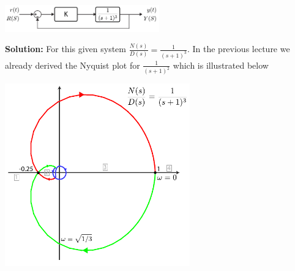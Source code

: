 \documentclass[twoside]{article}
\begin{document}
\vspace{6 pt}

  \begin{minipage}[h]{1\linewidth}
    \begin{center}
      \includegraphics[width=0.5\textwidth]{ex3block}
    \end{center}
  \end{minipage}

\vspace{6 pt}

\textbf{Solution:} For this given system $\frac{N(s)}{D(s)} =
\frac{1}{(s+1)^3}$. In the previous lecture we already derived the
Nyquist plot for $\frac{1}{(s+1)^2}$ which is illustrated below

\vspace{6 pt}

  \begin{minipage}[h]{1\linewidth}
    \begin{center}
      \includegraphics[width=0.6\textwidth]{ex3}
    \end{center}
  \end{minipage}

\vspace{6 pt}
\end{document}
